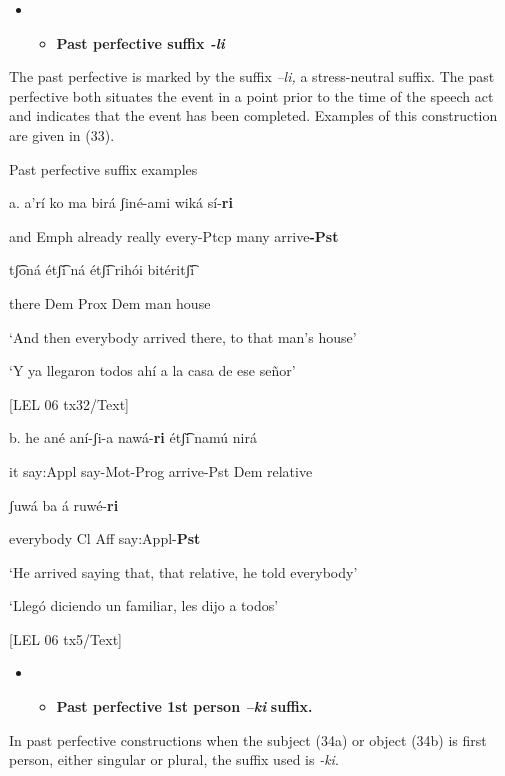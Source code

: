 \begin{itemize}
\item \begin{itemize}
\item \textbf{Past perfective suffix \textit{{}-}}\textbf{\textit{li}}
\end{itemize}
\end{itemize}

The past perfective is marked by the suffix \textit{–li,} a stress-neutral suffix. The past perfective both situates the event in a point prior to the time of the speech act and indicates that the event has been completed. Examples of this construction are given in (33).

   Past perfective suffix examples

a.   a’rí   ko   ma     birá   ʃiné-ami   wiká   sí-\textbf{ri}   

and  Emph  already     really  every-Ptcp  many  arrive\textbf{{}-Pst}

tʃ͡oná   étʃ͡i   ná   étʃ͡i   rihói   bitéritʃ͡i

there  Dem  Prox  Dem  man  house

‘And then everybody arrived there, to that man’s house’  

 ‘Y ya llegaron todos ahí a la casa de ese señor’  

[LEL 06 tx32/Text]

b.   he   ané     aní-ʃi-a   nawá-\textbf{ri}     étʃ͡i    namú nirá 

    it  say:Appl  say-Mot-Prog  arrive-Pst  Dem  relative

ʃuwá         ba  á       ruwé-\textbf{ri}    

everybody  Cl  Aff  say:Appl-\textbf{Pst}

    ‘He arrived saying that, that relative, he told everybody’

    ‘Llegó diciendo un familiar, les dijo a todos’    

    [LEL 06 tx5/Text]

\begin{itemize}
\item \begin{itemize}
\item \textbf{Past perfective 1st person \textit{–ki} }\textbf{suffix.}
\end{itemize}
\end{itemize}

In past perfective constructions when the subject (34a) or object (34b) is first person, either singular or plural, the suffix used is \textit{{}-ki}. 

